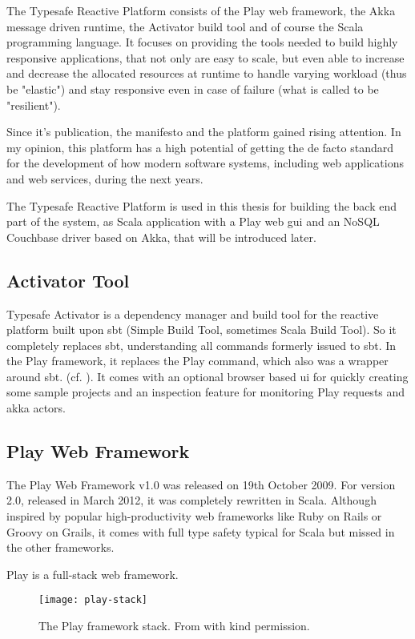 The Typesafe Reactive Platform consists of the Play web framework, the Akka message driven runtime, the Activator build tool and of course the Scala programming language. It focuses on providing the tools needed to build highly responsive applications, that not only are easy to scale, but even able to increase and decrease the allocated resources at runtime to handle varying workload (thus be "elastic") and stay responsive even in case of failure (what is called to be "resilient").

Since it's publication, the manifesto and the platform gained rising attention. In my opinion, this platform has a high potential of getting the de facto standard for the development of how modern software systems, including web applications and web services, during the next years.

The Typesafe Reactive Platform is used in this thesis for building the back end part of the system, as Scala application with a Play web gui and an NoSQL Couchbase driver based on Akka, that will be introduced later. %

\subsection{Activator Tool}

Typesafe Activator is a dependency manager and build tool for the reactive platform built upon sbt (Simple Build Tool, sometimes Scala Build Tool). So it completely replaces sbt, understanding all commands formerly issued to sbt. In the Play framework, it replaces the Play command, which also was a wrapper around sbt. (cf. \cite{typesafeact}). It comes with an optional browser based ui for quickly creating some sample projects and an inspection feature for monitoring Play requests and akka actors. 

\subsection{Play Web Framework}


The Play Web Framework v1.0 was released on 19th October 2009. For version 2.0, released in March 2012, it was completely rewritten in Scala.
Although inspired by popular high-productivity web frameworks like Ruby on Rails or Groovy on Grails, it comes with full type safety typical for Scala but missed in the other frameworks.

Play is a full-stack web framework.

\begin{figure}[H]
\centering
\texttt{[image: play-stack]}
\caption{The Play framework stack. From \cite{play-book} with kind permission.}
\end{figure}

